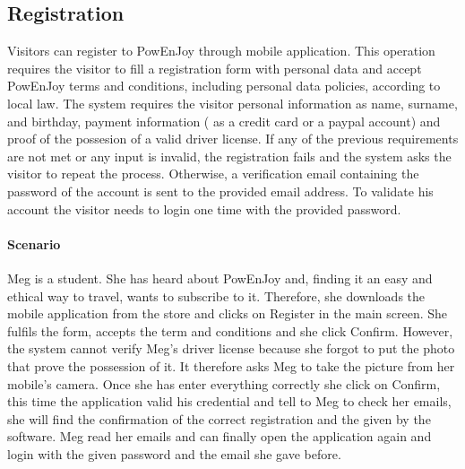 \subsection{Registration}
Visitors can register to PowEnJoy through mobile application. This operation requires the visitor to fill a registration form with personal data and accept PowEnJoy terms and conditions, including personal data policies, according to local law. The system requires the visitor personal information as name, surname, and birthday, payment information ( as a credit card or a paypal account) and proof of the possesion of a valid driver license.
If any of the previous requirements are not met or any input is invalid, the registration fails and the system asks the visitor to repeat the process. Otherwise, a verification email containing the password of the account is sent to the provided email address. To validate his account the visitor needs to login one time with the provided password.
\paragraph{Scenario}
Meg is a student. She has heard about PowEnJoy and, finding it an easy and ethical way to travel, wants to subscribe to it.
Therefore, she downloads the mobile application from the store and clicks on Register in the main screen. She fulfils the form, accepts the term and conditions  and she click Confirm. However, the system cannot verify Meg's driver license because she forgot to put the photo that prove the possession of it. It therefore asks Meg to take the picture from her mobile's camera. Once she has enter everything correctly she click on Confirm, this time the application valid his credential and tell to Meg to check her emails, she will find the confirmation of the correct registration and the given by the software. Meg read her emails and can finally open the application again and login with the given password and the email she gave before.

